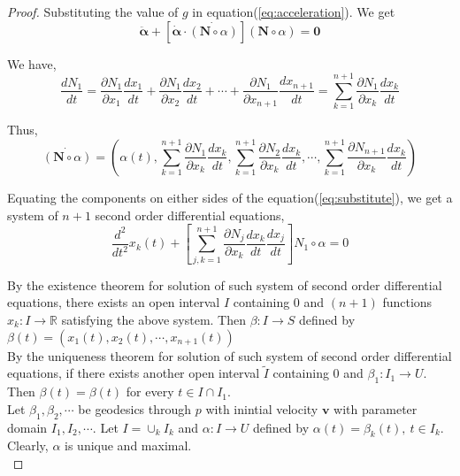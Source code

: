 \begin{proof}
	Substituting the value of $g$ in equation(\ref{eq:acceleration}). We get 
	\begin{equation}
		\ddot{\boldsymbol{\alpha}} + \left[ \dot{\boldsymbol{\alpha}} \cdot \dot{(\mathbf{N} \circ \alpha)}\right] (\mathbf{N} \circ \alpha) = \mathbf{0}
		\label{eq:substitute}
	\end{equation}

	We have,
	\begin{equation}
		\dfrac{dN_1}{dt} = \dfrac{\partial N_1}{\partial x_1} \dfrac{dx_1}{dt} +  \dfrac{\partial N_1}{\partial x_2} \dfrac{dx_2}{dt} + \cdots + \dfrac{\partial N_1}{\partial x_{n+1}} \dfrac{dx_{n+1}}{dt} = \sum_{k=1}^{n+1} \dfrac{\partial N_1}{\partial x_k} \dfrac{dx_k}{dt}
	\end{equation}

	Thus,
	\begin{equation}
		\dot{(\mathbf{N} \circ \alpha)} = \left( \alpha(t), \sum_{k=1}^{n+1} \dfrac{\partial N_1}{\partial x_k} \dfrac{dx_k}{dt}, \sum_{k=1}^{n+1} \dfrac{\partial N_2}{\partial x_k} \dfrac{dx_k}{dt}, \cdots, \sum_{k=1}^{n+1} \dfrac{\partial N_{n+1}}{\partial x_k} \dfrac{dx_k}{dt} \right)
	\end{equation}

	Equating the components on either sides of the equation(\ref{eq:substitute}), we get a system of $n+1$ second order differential equations,
	\begin{equation}
		\dfrac{d^2}{dt^2}x_k(t) + \left[ \sum_{j,k=1}^{n+1} \dfrac{\partial N_j}{\partial x_k} \dfrac{dx_k}{dt}\dfrac{dx_j}{dt}\right] N_1 \circ \alpha = 0
	\end{equation}

	By the existence theorem for solution of such system of second order differential equations, there exists an open interval $I$ containing $0$ and $(n+1)$ functions $x_k : I \to \mathbb{R}$ satisfying the above system. Then $\beta : I \to S$ defined by $\beta(t) = \left( x_1(t),x_2(t),\cdots,x_{n+1}(t) \right)$\\

	By the uniqueness theorem for solution of such system of second order differential equations, if there exists another open interval $\tilde{I}$ containing $0$ and $\beta_1 : I_1 \to U$. Then $\beta(t) = \beta(t)$ for every $t \in I \cap I_1$.\\

	Let $\beta_1,\beta_2,\cdots$ be geodesics through $p$ with inintial velocity $\mathbf{v}$ with parameter domain $I_1,I_2,\cdots$. Let $I = \cup_k I_k$ and $\alpha : I \to U$ defined by $\alpha(t) = \beta_k(t),\ t \in I_k$. Clearly, $\alpha$ is unique and maximal.\\


\end{proof}
